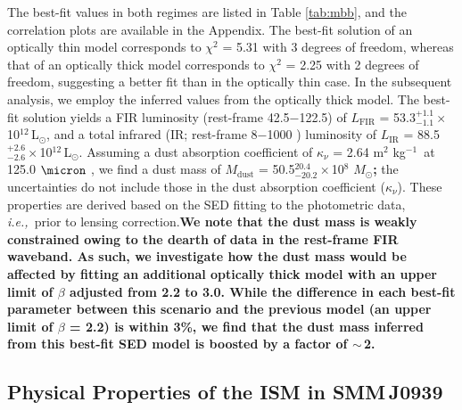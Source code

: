 \documentclass[iop, revtex4]{emulateapj}
\newcommand{\Msun}{\mbox{$M_{\odot}$}}
\newcommand{\Lsun}{\mbox{L$_{\odot}$}}
\newcommand{\ie}{{\sl i.e.,~}}
\newcommand{\pmOne}{\mbox{$^{-1}$}}
\begin{document}

The best-fit values in both regimes are listed in Table \ref{tab:mbb}, and the correlation plots are available in the Appendix. The best-fit solution of an optically thin
model corresponds to $\chi^2$ = 5.31 with 3 degrees of freedom, whereas that of an optically thick model
corresponds to $\chi^2$ = 2.25 with 2 degrees of freedom, suggesting a better fit than in the optically thin
case. In the subsequent analysis, we employ the inferred values from the optically thick model.
The best-fit solution yields a FIR luminosity (rest-frame 42.5$-$122.5\micron) of $L_\textrm{FIR}$ = 53.3$^{+1.1}_{-1.1}$\,$\times$\,10$^{12}$\,\Lsun, and a total infrared (IR; rest-frame 8$-$1000 \micron) luminosity of $L_\textrm{IR}$ = 88.5$^{+2.6}_{-2.6}$\,$\times$\,10$
^{12}$\,\Lsun. Assuming a dust absorption coefficient of $\kappa_{\nu}$ = 2.64\,\,m$^2$\,\,kg\pmOne\ at 125.0\,\,$
\micron$ \citep{Dunne03a}, we find a dust mass of $M_\textrm{dust}$ = 50.5$^{20.4}_{-20.2}\times$10$^8$\,\,\Msun{\bf ;} the uncertainties do not include those in the dust absorption coefficient ($\kappa_{\nu}$). These properties are derived based on the SED fitting to the photometric data, \ie prior
to lensing correction.{\bf We note that the dust mass is weakly constrained owing to the dearth of data in the {\bf rest-frame} FIR waveband. As such, we investigate how the dust mass would be affected by fitting an additional optically thick model with an upper limit of 
 $\beta$ adjusted from 2.2 to 3.0. While the difference in each best-fit parameter between this scenario and the previous model (an upper limit of $\beta$ = 2.2) is within 3\%, we find that the dust mass inferred from this best-fit SED model is boosted by a factor of $\sim$\,2.}
\subsection{Physical Properties of the ISM in SMM\,J0939}
\end{document}
